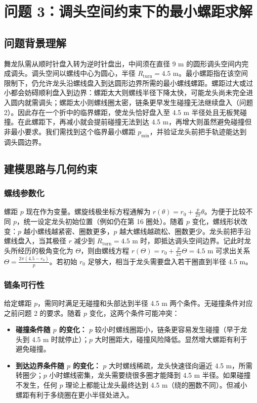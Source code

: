 \documentclass[UTF8]{ctexart}
\begin{document}
\newpage

\section{问题 3：调头空间约束下的最小螺距求解}

\subsection{问题背景理解}
舞龙队需从顺时针盘入转为逆时针盘出，中间须在直径 9 m 的圆形调头空间内完成调头。调头空间以螺线中心为圆心，半径 $R_{\text{turn}}=4.5$ m。最小螺距指在该空间限制下，仍允许龙头沿螺线盘入到达圆形边界所需的最小螺线螺距。螺距过大或过小都会妨碍顺利盘入到边界：螺距太大则螺线半径下降太快，可能龙头尚未完全进入圆内就需调头；螺距太小则螺线圈太密，链条更早发生碰撞无法继续盘入（问题 2）。因此存在一个折中的临界螺距，使龙头恰好盘入至 4.5 m 半径处且无板凳碰撞。在此螺距下，再减小就会提前碰撞无法到达 4.5 m，再增大则虽然避免碰撞但非最小要求。我们需找到这个临界最小螺距 $p_{\min}$，并验证龙头前把手轨迹能达到调头圆边界。

\subsection{建模思路与几何约束}

\subsubsection{螺线参数化}
螺距 $p$ 现在作为变量。螺旋线极坐标方程通解为 $r(\theta)=r_0 + \frac{p}{2\pi}\theta$。为便于比较不同 $p$，统一设定龙头初始位置（例如仍在第 16 圈处）。随着 $p$ 变化，螺线形状改变：$p$ 越小螺线越紧密、圈数更多，$p$ 越大螺线越疏松、圈数更少。龙头前把手沿螺线盘入，当其极径 $r$ 减少到 $R_{\text{turn}}=4.5$ m 时，即抵达调头空间边界。记此时龙头所经历的极角变化为 $\Theta$，则由螺线方程 $r(\Theta)=r_0 + \frac{p}{2\pi}\Theta = 4.5$ m 可求出关系 $\Theta=\frac{2\pi(4.5-r_0)}{p}$。若初始 $r_0$ 足够大，相当于龙头需要盘入若干圈直到半径 4.5 m。

\subsubsection{链条可行性}
给定螺距 $p$，需同时满足无碰撞和头部达到半径 4.5 m 两个条件。无碰撞条件对应之前问题 2 的要求。随着 $p$ 变化，这两个条件可能冲突：
\begin{itemize}
    \item \textbf{碰撞条件随 $p$ 的变化：} $p$ 较小时螺线圈距小，链条更容易发生碰撞（早于龙头到 4.5 m 时就停止）；$p$ 大时圈距大，碰撞风险降低。显然增大螺距有利于避免碰撞。
    \item \textbf{到达边界条件随 $p$ 的变化：} $p$ 大时螺线稀疏，龙头快速径向逼近 4.5 m，所需转圈少；$p$ 小时螺线密集，龙头需要绕很多圈才能降到 4.5 m 半径。如果碰撞不发生，任何 $p$ 理论上都能让龙头最终达到 4.5 m（绕的圈数不同）。但减小螺距有利于多绕圈在更小半径处进入。
\end{itemize}
\end{document}
